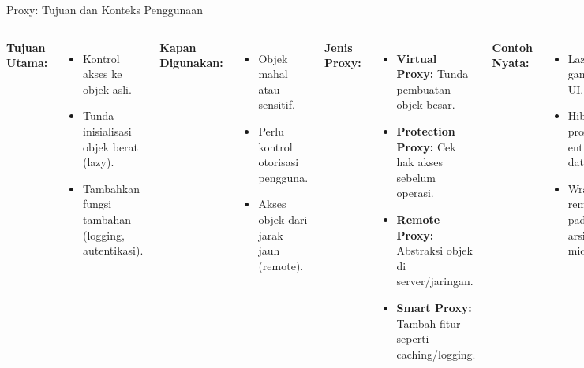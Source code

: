 \documentclass[aspectratio=169, table]{beamer}
\begin{document}
\begin{frame}{Proxy: Tujuan dan Konteks Penggunaan}
	\vspace{20pt}
	\begin{columns}[T,onlytextwidth]
		\textbf{Tujuan Utama:}
		\begin{itemize}
			\item Kontrol akses ke objek asli.
			\item Tunda inisialisasi objek berat (lazy).
			\item Tambahkan fungsi tambahan (logging, autentikasi).
		\end{itemize}
		
		\textbf{Kapan Digunakan:}
		\begin{itemize}
			\item Objek mahal atau sensitif.
			\item Perlu kontrol otorisasi pengguna.
			\item Akses objek dari jarak jauh (remote).
		\end{itemize}
		
		\textbf{Jenis Proxy:}
		\begin{itemize}
			\item \textbf{Virtual Proxy:} Tunda pembuatan objek besar.
			\item \textbf{Protection Proxy:} Cek hak akses sebelum operasi.
			\item \textbf{Remote Proxy:} Abstraksi objek di server/jaringan.
			\item \textbf{Smart Proxy:} Tambah fitur seperti caching/logging.
		\end{itemize}
		
		\textbf{Contoh Nyata:}
		\begin{itemize}
			\item Lazy loading gambar di UI.
			\item Hibernate proxy untuk entitas database.
			\item Wrapper remote API pada arsitektur microservices.
		\end{itemize}
	\end{columns}
\end{frame}
\end{document}
